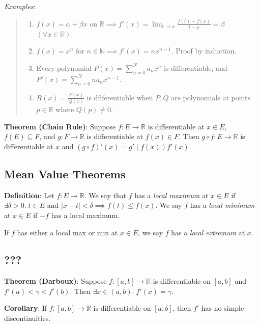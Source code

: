 \documentclass[11pt]{article}
\begin{document}
\emph{Examples}:
\begin{quote}\vspace{-0.3cm}
	\begin{enumerate}
	\item $f(x) = \alpha + \beta x$ on $\mathbb{R} \implies f'(x) = \lim_{t \to x} \frac{f(t) - f(x)}{t-x} = \beta$ $(\forall x \in \mathbb{R})$.
	\item $f(x) = x^n$ for $n \in \mathbb{N} \implies f'(x) = nx^{n-1}$. Proof by induction.
	\item Every polynomial $P(x) = \sum_{n=0}^N a_n x^n$ is differentiable, and $P'(x) = \sum_{n=0}^N na_n x^{n-1}$.
	\item $R(x) = \frac{P(x)}{Q(x)}$ is dfiferentiable when $P, Q$ are polynomials at points $p \in \mathbb{R}$ where $Q(p) \neq 0$.
	\end{enumerate}
\end{quote}

\textbf{Theorem (Chain Rule)}: Suppose $f : E \to \mathbb{R}$ is differentiable at $x \in E$, $f(E) \subseteq F$, and $g : F \to \mathbb{R}$ is differentiable at $f(x) \in F$. Then $g \circ f : E \to \mathbb{R}$ is differentiable at $x$ and $(g \circ f)'(x) = g'(f(x)) f'(x)$.

\subsection{Mean Value Theorems}

\textbf{Definition}: Let $f : E \to \mathbb{R}$. We say that $f$ has a \emph{local maximum} at $x \in E$ if $\exists \delta > 0.\; t \in E$ and $|x-t| < \delta \implies f(t) \leq f(x)$. We say $f$ has a \emph{local minimum} at $x \in E$ if $-f$ has a local maximum.

If $f$ has either a local max or min at $x \in E$, we say $f$ has a \emph{local extremum} at $x$.

\subsection{???}


\textbf{Theorem (Darboux)}: Suppose $f : [a,b] \to \mathbb{R}$ is differentiable on $[a,b]$ and $f'(a) < \gamma < f'(b)$. Then $\exists x \in (a,b).\; f'(x) = \gamma$.

\textbf{Corollary}: If $f : [a,b] \to \mathbb{R}$ is differentiable on $[a,b]$, then $f'$ has no simple discontinuities.
\end{document}
